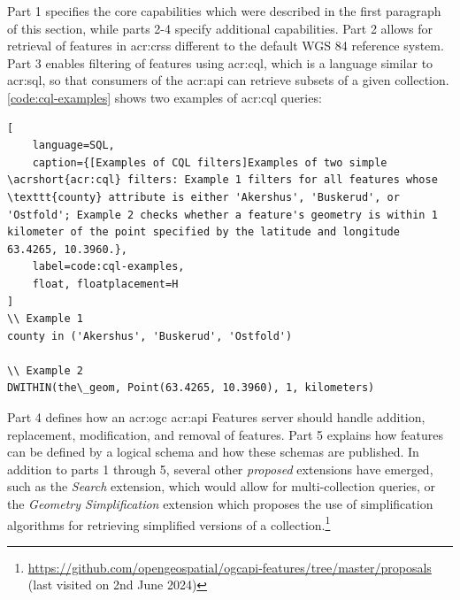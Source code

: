 Part 1 specifies the core capabilities which were described in the first paragraph of this section, while parts 2-4 specify additional capabilities. Part 2 allows for retrieval of features in \glspl{acr:crs} different to the default WGS 84 reference system. Part 3 enables filtering of features using \gls{acr:cql}, which is a language similar to \acrshort{acr:sql}, so that consumers of the \acrshort{acr:api} can retrieve subsets of a given collection. \autoref{code:cql-examples} shows two examples of \gls{acr:cql} queries:

\begin{lstlisting}[
    language=SQL,
    caption={[Examples of CQL filters]Examples of two simple \acrshort{acr:cql} filters: Example 1 filters for all features whose \texttt{county} attribute is either 'Akershus', 'Buskerud', or 'Ostfold'; Example 2 checks whether a feature's geometry is within 1 kilometer of the point specified by the latitude and longitude 63.4265, 10.3960.},
    label=code:cql-examples,
    float, floatplacement=H
]
\\ Example 1
county in ('Akershus', 'Buskerud', 'Ostfold')

\\ Example 2
DWITHIN(the\_geom, Point(63.4265, 10.3960), 1, kilometers)
\end{lstlisting}

Part 4 defines how an \acrshort{acr:ogc} \acrshort{acr:api} Features server should handle addition, replacement, modification, and removal of features. Part 5 explains how features can be defined by a logical schema and how these schemas are published. In addition to parts 1 through 5, several other \textit{proposed} extensions have emerged, such as the \textit{Search} extension, which would allow for multi-collection queries, or the \textit{Geometry Simplification} extension which proposes the use of simplification algorithms for retrieving simplified versions of a collection.\footnote{\url{https://github.com/opengeospatial/ogcapi-features/tree/master/proposals} (last visited on 2nd June 2024)}





